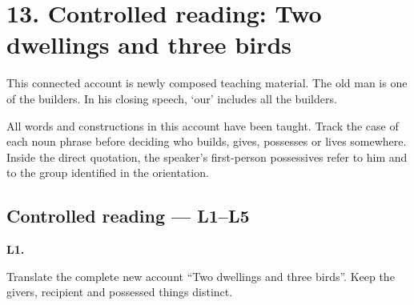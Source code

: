 \section*{13. Controlled reading: Two dwellings and three birds}

This connected account is newly composed teaching material. The old man is one of the builders. In his closing speech, ‘our’ includes all the builders.

\par\begin{minipage}{\linewidth}\raggedright
{}
\end{minipage}\par

All words and constructions in this account have been taught. Track the case of each noun phrase before deciding who builds, gives, possesses or lives somewhere. Inside the direct quotation, the speaker’s first-person possessives refer to him and to the group identified in the orientation.

\subsection*{Controlled reading — L1–L5}

\par\begin{minipage}{\linewidth}\raggedright
\textbf{L1.}

Translate the complete new account “Two dwellings and three birds”. Keep the givers, recipient and possessed things distinct.

\end{minipage}\par\addvspace{4pt}

